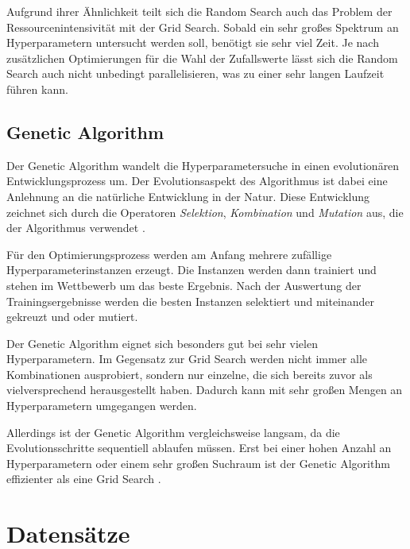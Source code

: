Aufgrund ihrer Ähnlichkeit teilt sich die Random Search auch das Problem der Ressourcenintensivität mit der Grid Search.
Sobald ein sehr großes Spektrum an Hyperparametern untersucht werden soll, benötigt sie sehr viel Zeit.
Je nach zusätzlichen Optimierungen für die Wahl der Zufallswerte lässt sich die Random Search auch nicht unbedingt parallelisieren, was zu einer sehr langen Laufzeit führen kann.

\subsection{Genetic Algorithm}
Der Genetic Algorithm \cite{hyperparameters-genetic-algorithm} wandelt die Hyperparametersuche in einen evolutionären Entwicklungsprozess um.
Der Evolutionsaspekt des Algorithmus ist dabei eine Anlehnung an die natürliche Entwicklung in der Natur.
Diese Entwicklung zeichnet sich durch die Operatoren \textit{Selektion}, \textit{Kombination} und \textit{Mutation} aus, die der Algorithmus verwendet .
\newline

Für den Optimierungsprozess werden am Anfang mehrere zufällige Hyperparameterinstanzen erzeugt.
Die Instanzen werden dann trainiert und stehen im Wettbewerb um das beste Ergebnis.
Nach der Auswertung der Trainingsergebnisse werden die besten Instanzen selektiert und miteinander gekreuzt und oder mutiert.
\newline

Der Genetic Algorithm eignet sich besonders gut bei sehr vielen Hyperparametern.
Im Gegensatz zur Grid Search werden nicht immer alle Kombinationen ausprobiert, sondern nur einzelne, die sich bereits zuvor als vielversprechend herausgestellt haben.
Dadurch kann mit sehr großen Mengen an Hyperparametern umgegangen werden.
\newline

Allerdings ist der Genetic Algorithm vergleichsweise langsam, da die Evolutionsschritte sequentiell ablaufen müssen.
Erst bei einer hohen Anzahl an Hyperparametern oder einem sehr großen Suchraum ist der Genetic Algorithm effizienter als eine Grid Search \cite{hyperparameters-search-comparison-focus-genetic}.

\section{Datensätze}

